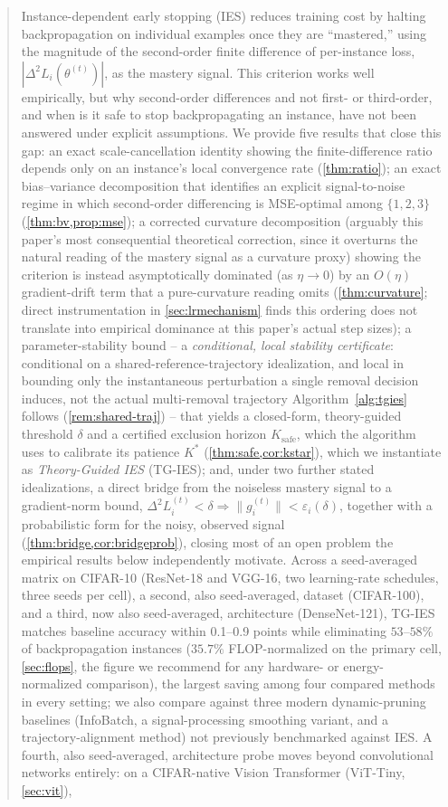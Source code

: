 \documentclass{article}
\theoremstyle{plain}
\theoremstyle{definition}
\theoremstyle{remark}
\begin{document}
\begin{abstract}
Instance-dependent early stopping (IES) reduces training cost by halting backpropagation on individual examples once they are ``mastered,'' using the magnitude of the second-order finite difference of per-instance loss, $|\Delta^2 L_i(\theta^{(t)})|$, as the mastery signal. This criterion works well empirically, but why second-order differences and not first- or third-order, and when is it safe to stop backpropagating an instance, have not been answered under explicit assumptions. We provide five results that close this gap: an exact scale-cancellation identity showing the finite-difference ratio depends only on an instance's local convergence rate (\cref{thm:ratio}); an exact bias--variance decomposition that identifies an explicit signal-to-noise regime in which second-order differencing is MSE-optimal among $\{1,2,3\}$ (\cref{thm:bv,prop:mse}); a corrected curvature decomposition (arguably this paper's most consequential theoretical correction, since it overturns the natural reading of the mastery signal as a curvature proxy) showing the criterion is instead asymptotically dominated (as $\eta\to0$) by an $O(\eta)$ gradient-drift term that a pure-curvature reading omits (\cref{thm:curvature}; direct instrumentation in \cref{sec:lrmechanism} finds this ordering does not translate into empirical dominance at this paper's actual step sizes); a parameter-stability bound -- a \emph{conditional, local stability certificate}: conditional on a shared-reference-trajectory idealization, and local in bounding only the instantaneous perturbation a single removal decision induces, not the actual multi-removal trajectory Algorithm~\ref{alg:tgies} follows (\cref{rem:shared-traj}) -- that yields a closed-form, theory-guided threshold $\delta$ and a certified exclusion horizon $K_{\mathrm{safe}}$, which the algorithm uses to calibrate its patience $K^*$ (\cref{thm:safe,cor:kstar}), which we instantiate as \emph{Theory-Guided IES} (TG-IES); and, under two further stated idealizations, a direct bridge from the noiseless mastery signal to a gradient-norm bound, $\Delta^2 L_i^{(t)}<\delta \Rightarrow \|g_i^{(t)}\|<\varepsilon_i(\delta)$, together with a probabilistic form for the noisy, observed signal (\cref{thm:bridge,cor:bridgeprob}), closing most of an open problem the empirical results below independently motivate. Across a seed-averaged matrix on CIFAR-10 (ResNet-18 and VGG-16, two learning-rate schedules, three seeds per cell), a second, also seed-averaged, dataset (CIFAR-100), and a third, now also seed-averaged, architecture (DenseNet-121), TG-IES matches baseline accuracy within 0.1--0.9 points while eliminating $53$--$58\%$ of backpropagation instances ($35.7\%$ FLOP-normalized on the primary cell, \cref{sec:flops}, the figure we recommend for any hardware- or energy-normalized comparison), the largest saving among four compared methods in every setting; we also compare against three modern dynamic-pruning baselines (InfoBatch, a signal-processing smoothing variant, and a trajectory-alignment method) not previously benchmarked against IES. A fourth, also seed-averaged, architecture probe moves beyond convolutional networks entirely: on a CIFAR-native Vision Transformer (ViT-Tiny, \cref{sec:vit}), 
\end{abstract}
\end{document}
